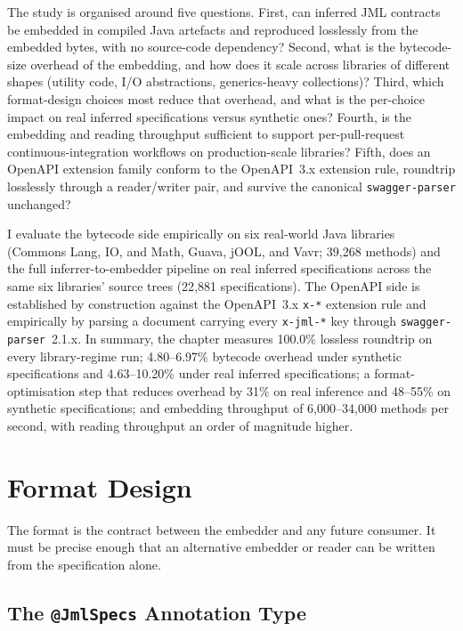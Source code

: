 The study is organised around five questions. First, can inferred JML contracts
be embedded in compiled Java artefacts and reproduced losslessly from the
embedded bytes, with no source-code dependency? Second, what is the
bytecode-size overhead of the embedding, and how does it scale across libraries
of different shapes (utility code, I/O abstractions, generics-heavy
collections)? Third, which format-design choices most reduce that overhead, and
what is the per-choice impact on real inferred specifications versus synthetic
ones? Fourth, is the embedding and reading throughput sufficient to support
per-pull-request continuous-integration workflows on production-scale libraries?
Fifth, does an OpenAPI extension family conform to the OpenAPI~3.x extension
rule, roundtrip losslessly through a reader/writer pair, and survive the
canonical \texttt{swagger-parser} unchanged?

I evaluate the bytecode side empirically on six real-world Java libraries
(Commons Lang, IO, and Math, Guava, jOOL, and Vavr; 39{,}268 methods) and the
full inferrer-to-embedder pipeline on real inferred specifications across the
same six libraries' source trees (22{,}881 specifications). The OpenAPI side is
established by construction against the OpenAPI~3.x \texttt{x-*} extension rule
and empirically by parsing a document carrying every \texttt{x-jml-*} key
through \texttt{swagger-parser}~2.1.x. In summary, the chapter measures
100.0\% lossless roundtrip on every library-regime run; 4.80--6.97\%
bytecode overhead under synthetic specifications and 4.63--10.20\% under real
inferred specifications; a format-optimisation step that reduces overhead by
31\% on real inference and 48--55\% on synthetic specifications; and embedding
throughput of 6{,}000--34{,}000 methods per second, with reading throughput an
order of magnitude higher.

\section{Format Design}
\label{sec:a2-format}

The format is the contract between the embedder and any future consumer. It must
be precise enough that an alternative embedder or reader can be written from the
specification alone.

\subsection{The \texttt{@JmlSpecs} Annotation Type}

